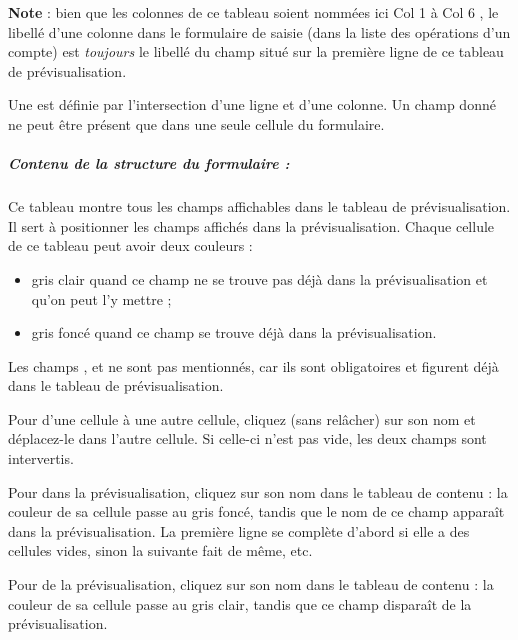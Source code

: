 \textbf{Note} : bien que les colonnes de ce tableau soient nommées ici \og Col 1 \fg{} à \og Col 6 \fg{}, le libellé d'une colonne dans le formulaire de saisie (dans la liste des opérations d'un compte) est \emph{toujours} le libellé du champ situé sur la première ligne de ce tableau de prévisualisation.
 
Une  est définie par l'intersection d'une ligne et d'une colonne. Un champ donné ne peut être présent que dans une seule cellule du formulaire.


\subparagraph{Contenu de la structure du formulaire :\label{setup-form-content-fields}}

Ce tableau montre tous les champs affichables dans le tableau de prévisualisation. Il sert à positionner les champs affichés dans la prévisualisation. Chaque cellule de ce tableau peut avoir deux couleurs :

\begin{itemize}
	\item gris clair quand ce champ ne se trouve pas déjà dans la prévisualisation et qu'on peut l'y mettre ;
	\item gris foncé quand ce champ se trouve déjà dans la prévisualisation.
\end{itemize}

Les champs ,  et  ne sont pas mentionnés, car ils sont obligatoires et figurent déjà dans le tableau de prévisualisation.

Pour  d'une cellule à une autre cellule, cliquez (sans relâcher) sur son nom et déplacez-le dans l'autre cellule. Si celle-ci n'est pas vide, les deux champs sont intervertis.

Pour  dans la prévisualisation, cliquez sur son nom dans le tableau de contenu : la couleur de sa cellule passe au gris foncé, tandis que le nom de ce champ apparaît dans la prévisualisation. La première ligne se complète d'abord si elle a des cellules vides, sinon la suivante fait de même, etc.


Pour  de la  prévisualisation, cliquez sur son nom dans le tableau de contenu : la couleur de sa cellule passe au gris clair, tandis que ce champ disparaît de la prévisualisation.


